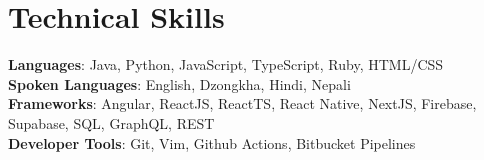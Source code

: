 \documentclass[letterpaper,11pt]{article}
\begin{document}
\section{Technical Skills}
 \begin{itemize}[leftmargin=0.15in, label={}]
    \small{\item{
     \textbf{Languages}{: Java, Python, JavaScript, TypeScript, Ruby, HTML/CSS} \\
     \textbf{Spoken Languages}{: English, Dzongkha, Hindi, Nepali} \\
     \textbf{Frameworks}{: Angular, ReactJS, ReactTS, React Native, NextJS, Firebase, Supabase, SQL, GraphQL, REST} \\
     \textbf{Developer Tools}{: Git, Vim, Github Actions, Bitbucket Pipelines} \\
    }}
 \end{itemize}




\end{document}
